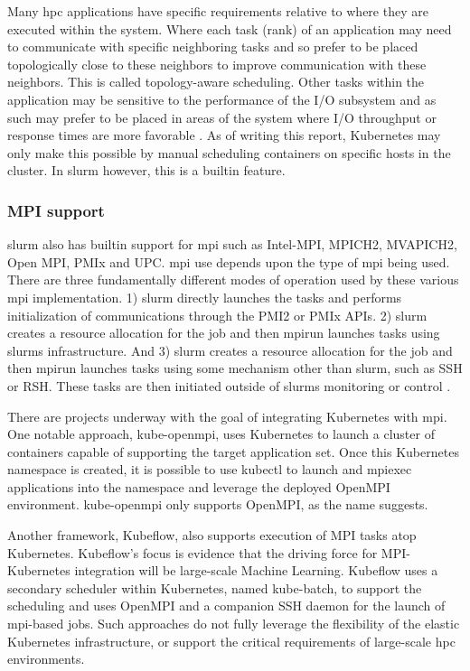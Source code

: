 \documentclass[12pt]{article}
\begin{document}
Many \gls{hpc} applications have specific requirements relative to where they are executed within the system. Where each task (rank) of an application may need to communicate with specific neighboring tasks and so prefer to be placed topologically close to these neighbors to improve communication with these neighbors. This is called topology-aware scheduling. Other tasks within the application may be sensitive to the performance of the I/O subsystem and as such may prefer to be placed in areas of the system where I/O throughput or response times are more favorable \cite{stackhpc-kubernetes-mpi}. As of writing this report, Kubernetes may only make this possible by manual scheduling containers on specific hosts in the cluster. In \gls{slurm} however, this is a builtin feature.

\subsubsection{MPI support}
\gls{slurm} also has builtin support for \gls{mpi} such as Intel-MPI, MPICH2, MVAPICH2, Open MPI, PMIx and UPC. \gls{mpi} use depends upon the type of \gls{mpi} being used. There are three fundamentally different modes of operation used by these various \gls{mpi} implementation. 1) \gls{slurm} directly launches the tasks and performs initialization of communications through the PMI2 or PMIx APIs. 2) \gls{slurm} creates a resource allocation for the job and then mpirun launches tasks using \gls{slurm}s infrastructure. And 3) \gls{slurm} creates a resource allocation for the job and then mpirun launches tasks using some mechanism other than \gls{slurm}, such as SSH or RSH. These tasks are then initiated outside of \gls{slurm}s monitoring or control \cite{slurm-pmi}.

There are projects underway with the goal of integrating Kubernetes with \gls{mpi}. One notable approach, kube-openmpi, uses Kubernetes to launch a cluster of containers capable of supporting the target application set. Once this Kubernetes namespace is created, it is possible to use kubectl to launch and mpiexec applications into the namespace and leverage the deployed OpenMPI environment. kube-openmpi only supports OpenMPI, as the name suggests.

Another framework, Kubeflow, also supports execution of MPI tasks atop Kubernetes. Kubeflow’s focus is evidence that the driving force for MPI-Kubernetes integration will be large-scale Machine Learning. Kubeflow uses a secondary scheduler within Kubernetes, named kube-batch, to support the scheduling and uses OpenMPI and a companion SSH daemon for the launch of \gls{mpi}-based jobs. Such approaches do not fully leverage the flexibility of the elastic Kubernetes infrastructure, or support the critical requirements of large-scale \gls{hpc} environments.
\end{document}
